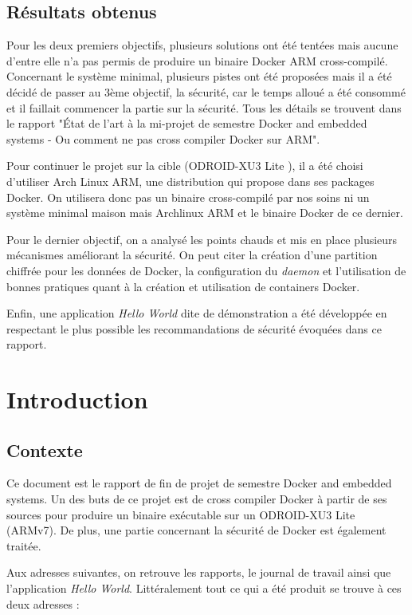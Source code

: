 \documentclass[11pt,a4paper,oneside]{report}
\newcommand{\oldreportname}{État de l’art à la mi-projet de semestre Docker and embedded systems - Ou comment ne pas cross compiler Docker sur ARM}
\newcommand{\odroid}{ODROID-XU3 Lite }
\begin{document}
\section{Résultats obtenus}
Pour les deux premiers objectifs, plusieurs solutions ont été tentées mais aucune d'entre elle n'a pas permis de produire un binaire Docker ARM cross-compilé. Concernant le système minimal, plusieurs pistes ont été proposées mais il a été décidé de passer au 3ème objectif, la sécurité, car le temps alloué a été consommé et il faillait commencer la partie sur la sécurité. Tous les détails se trouvent dans le rapport "\oldreportname".

Pour continuer le projet sur la cible (\odroid), il a été choisi d'utiliser Arch Linux ARM, une distribution qui propose dans ses packages Docker. On utilisera donc pas un binaire cross-compilé par nos soins ni un système minimal maison mais Archlinux ARM et le binaire Docker de ce dernier.

Pour le dernier objectif, on a analysé les points chauds et mis en place plusieurs mécanismes améliorant la sécurité. On peut citer la création d'une partition chiffrée pour les données de Docker, la configuration du \textit{daemon} et l'utilisation de bonnes pratiques quant à la création et utilisation de containers Docker.

Enfin, une application \textit{Hello World} dite de démonstration a été développée en respectant le plus possible les recommandations de sécurité évoquées dans ce rapport.

\tableofcontents
{}

\pagestyle{normal}

\chapter{Introduction}

\section{Contexte}\label{contexte}

Ce document est le rapport de fin de projet de semestre Docker and embedded systems. Un des buts de ce projet est de cross compiler Docker à partir de ses sources pour produire un binaire exécutable sur un \odroid (ARMv7). De plus, une partie concernant la sécurité de Docker est également traitée.

Aux adresses suivantes, on retrouve les rapports, le journal de travail ainsi que l'application \textit{Hello World}. Littéralement tout ce qui a été produit se trouve à ces deux adresses :
\end{document}
